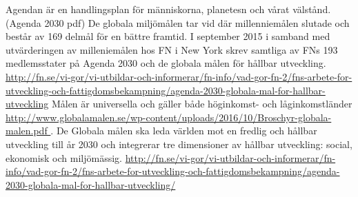 \documentclass{report}
\begin{document}
Agendan är en handlingsplan för människorna, planetesn och vårat välstånd.
 (Agenda 2030 pdf) De globala miljömålen tar vid där millenniemålen slutade och består av 169 delmål för en bättre framtid. I september 2015 i samband med utvärderingen av milleniemålen hos FN i New York skrev samtliga av FNs 193 medlemsstater på Agenda 2030 och de globala målen för hållbar utveckling. \url{ http://fn.se/vi-gor/vi-utbildar-och-informerar/fn-info/vad-gor-fn-2/fns-arbete-for-utveckling-och-fattigdomsbekampning/agenda-2030-globala-mal-for-hallbar-utveckling} Målen är universella och gäller både höginkomst- och låginkomstländer \url{http://www.globalamalen.se/wp-content/uploads/2016/10/Broschyr-globala-malen.pdf }. De Globala målen ska leda världen mot en fredlig och hållbar utveckling till år 2030 och integrerar tre dimensioner av hållbar utveckling: social, ekonomisk och miljömässig.  \url{http://fn.se/vi-gor/vi-utbildar-och-informerar/fn-info/vad-gor-fn-2/fns-arbete-for-utveckling-och-fattigdomsbekampning/agenda-2030-globala-mal-for-hallbar-utveckling/}
\end{document}
